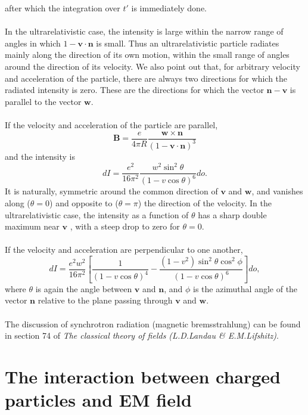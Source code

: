 after which the integration over $t'$ is immediately done.\\ \\
In the ultrarelativistic case, the intensity is large within the narrow range of angles in which $1-\bm{v}\cdot\bm{n}$ is small. Thus an ultrarelativistic particle radiates mainly along the direction of its own motion, within the small range  of angles around the direction of its velocity. We also point out that, for arbitrary velocity and acceleration of the particle, there are always two directions for which the radiated intensity is zero. These are the directions for
which the vector $\bm{n}-\bm{v}$ is parallel to the vector $\bm{w}$.\\ \\
If the velocity and acceleration of the particle are parallel,
\[\bm{B} = \frac{e}{4\pi R} \frac{\bm{w} \times \bm{n}}{(1-\bm{v}\cdot\bm{n})^3} \]
and the intensity is
\[dI = \frac{e^2}{16\pi^2} \frac{w^2 \sin^2 \theta}{(1-v\cos\theta)^6} do.\]
It is naturally, symmetric around the common direction of $\bm{v}$ and $\bm{w}$, and vanishes along ($\theta=0$) and opposite to ($\theta = \pi$) the direction of the velocity. In the ultrarelativistic case, the intensity as a function of $\theta$ has a sharp double maximum near $\bm{v}$ , with a steep drop to zero for $\theta = 0$.
\\ \\
If the velocity and acceleration are perpendicular to one another,
\[dI = \frac{e^2 w^2}{16\pi^2} \left[ \frac{1}{(1-v\cos\theta)^4} - \frac{(1-v^2)\sin^2\theta \cos^2\phi}{(1-v\cos\theta)^6} \right]do,\]
where $\theta$ is again the angle between $\bm{v}$ and $\bm{n}$, and $\phi$ is the azimuthal angle of the vector $\bm{n}$ relative to the plane passing through $\bm{v}$ and $\bm{w}$.
\\ \\
The discussion of synchrotron radiation (magnetic bremsstrahlung) can be found in section 74 of \emph{The classical theory of fields (L.D.Landau \& E.M.Lifshitz)}.

\section{The interaction between charged particles and EM field}
